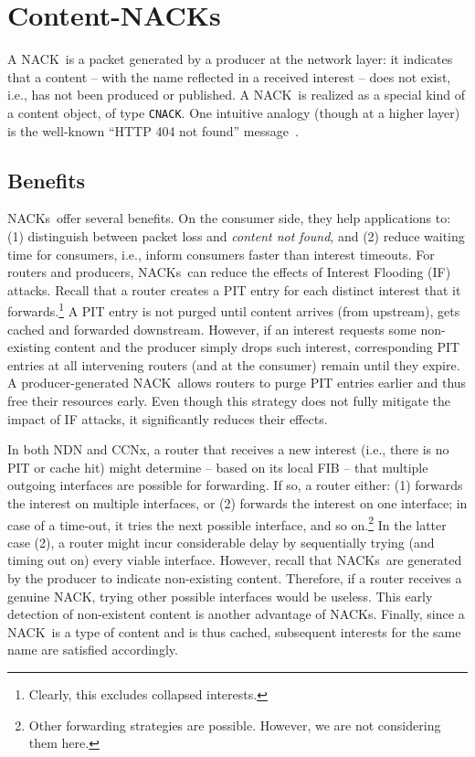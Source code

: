 \documentclass[conference]{IEEEtran}
\newcommand{\cnack}{\mbox{\sf {\cal c}NACK}}
\newcommand{\cnacks}{\mbox{\sf {\cal c}NACK}s}
\begin{document}
\section{Content-NACKs}
\label{sec:cnack}
A \cnack\ is a packet generated by a producer at the network layer: it indicates that a 
content -- with the name reflected in a received interest -- does not exist, i.e., has not
been produced or published. A \cnack\ is realized as a special kind of a content object, of type \texttt{CNACK}. 
One intuitive analogy (though at a higher layer) is the well-known ``HTTP 404 not found'' 
message~\cite{fielding1999hypertext}.

\subsection{Benefits}
\cnacks\ offer several benefits. On the consumer side, they help applications to:
(1) distinguish between packet loss and {\em content not found}, and (2) reduce 
waiting time for consumers, i.e., inform consumers faster than interest timeouts. 
For routers and producers, \cnacks\ can reduce the effects of Interest Flooding (IF) attacks. 
Recall that a router creates a PIT entry for each distinct interest that it forwards.\footnote{Clearly,
this excludes collapsed interests.} A PIT entry is not purged until content arrives (from upstream),
gets cached and forwarded downstream. However, if an interest requests 
some non-existing content and the producer simply drops such interest, corresponding PIT entries
at all intervening routers (and at the consumer) remain until they expire. A producer-generated \cnack\
allows routers to purge PIT entries earlier and thus free their resources early. Even though this strategy 
does not fully mitigate the impact of IF attacks, it significantly reduces their effects.

In both NDN and CCNx, a router that receives a new interest (i.e., there is no PIT or cache hit)
might determine -- based on its local FIB -- that multiple outgoing interfaces are possible for forwarding.
If so, a router either: (1) forwards the interest on multiple interfaces, or (2) forwards the interest on 
one interface; in case of a time-out, it tries the next possible interface, and so on.\footnote{Other 
forwarding strategies are possible. However, we are not considering them here.} 
In the latter case (2), a router might incur considerable delay by sequentially trying (and timing out on)
every viable interface. However, recall that \cnacks\ are generated by the producer to indicate non-existing content. 
Therefore, if a router receives a genuine \cnack, trying other possible interfaces would be useless. This 
early detection of non-existent content is another advantage of \cnacks. Finally, since a \cnack\ is 
a type of content and is thus cached, subsequent interests for the same name are satisfied accordingly.
\end{document}
